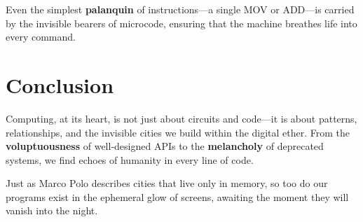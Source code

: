 \documentclass[12pt]{article}
\begin{document}
	Even the simplest \textbf{palanquin} of instructions—a single MOV or ADD—is carried by the invisible bearers of microcode, ensuring that the machine breathes life into every command.
	
	\section{Conclusion}
	Computing, at its heart, is not just about circuits and code—it is about patterns, relationships, and the invisible cities we build within the digital ether. From the \textbf{voluptuousness} of well-designed APIs to the \textbf{melancholy} of deprecated systems, we find echoes of humanity in every line of code.
	
	Just as Marco Polo describes cities that live only in memory, so too do our programs exist in the ephemeral glow of screens, awaiting the moment they will vanish into the night.
	
\end{document}
